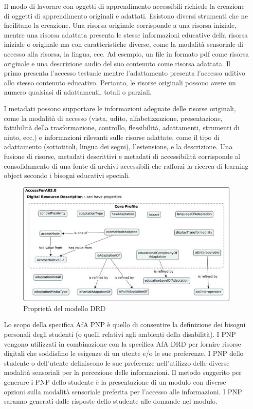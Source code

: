 Il modo di lavorare con oggetti di apprendimento accessibili richiede la creazione di oggetti di apprendimento originali e adattati. Esistono diversi strumenti che ne facilitano la creazione. Una risorsa originale corrisponde a una risorsa iniziale, mentre una risorsa adattata presenta le stesse informazioni educative della risorsa iniziale o originale ma con caratteristiche diverse, come la modalità sensoriale di accesso alla risorsa, la lingua, ecc. Ad esempio, un file in formato pdf come risorsa originale e una descrizione audio del suo contenuto come risorsa adattata. Il primo presenta l'accesso testuale mentre l'adattamento presenta l'accesso uditivo allo stesso contenuto educativo. Pertanto, le risorse originali possono avere un numero qualsiasi di adattamenti, totali o parziali.

I metadati possono supportare le informazioni adeguate delle risorse originali, come la modalità di accesso (vista, udito, alfabetizzazione, presentazione, fattibilità della trasformazione, controllo, flessibilità, adattamenti, strumenti di aiuto, ecc.) e informazioni rilevanti sulle risorse adattate, come il tipo di adattamento (sottotitoli, lingua dei segni), l'estensione, e la descrizione. Una fusione di risorse, metadati descrittivi e metadati di accessibilità corrisponde al consolidamento di una fonte di archivi accessibili che rafforzi la ricerca di learning object secondo i bisogni educativi speciali.

\begin{figure}[H]
\centering
\includegraphics[scale=0.7]{res/drd.png}
\caption{Proprietà del modello DRD}
\label{fig:drd}
\end{figure}

Lo scopo della specifica AfA PNP è quello di consentire la definizione dei bisogni personali degli studenti (o quelli relativi agli ambienti della disabilità). I PNP vengono utilizzati in combinazione con la specifica AfA DRD per fornire risorse digitali che soddisfino le esigenze di un utente e/o le sue preferenze. I PNP dello studente o dell'utente definiscono le sue preferenze nell'utilizzo delle diverse modalità sensoriali per la percezione delle informazioni. Il metodo suggerito per generare i PNP dello studente è la presentazione di un modulo con diverse opzioni sulla modalità sensoriale preferita per l'accesso alle informazioni. I PNP saranno generati dalle risposte dello studente alle domande nel modulo.

